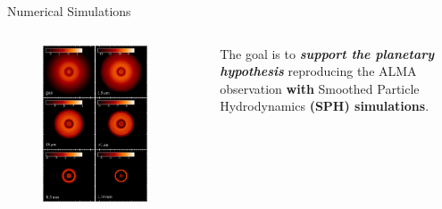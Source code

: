 \documentclass[9pt]{beamer}
\begin{document}
\begin{frame}{Numerical Simulations}
    \begin{columns}
        \begin{column}{0.40\textwidth}
            \vspace*{10pt}
            \begin{figure}
                \centering
                \includegraphics[width=0.85\textwidth]{dstau_sph}
            \end{figure}
        \end{column}
        \begin{column}{0.6\textwidth}
            \vspace*{10pt}

            The goal is to \alert{\textit{\textbf{support the planetary
            hypothesis}}} reproducing the ALMA observation \textbf{with}
            Smoothed Particle Hydrodynamics \alert{\textbf{(SPH) simulations}}.


\end{column}
\end{columns}
\end{frame}
\end{document}
